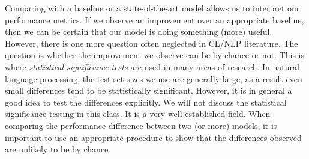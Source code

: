 Comparing with a baseline or a state-of-the-art model allows us
to interpret our performance metrics.
If we observe an improvement over an appropriate baseline,
then we can be certain that our model is doing something (more) useful.
However,
there is one more question often neglected in CL/NLP literature.
The question is whether the improvement we observe can be by chance or not.
This is where \emph{statistical significance tests} are used
in many areas of research.
In natural language processing,
the test set sizes we use are generally large,
as a result even small differences tend to be statistically significant.
However, it is in general a good idea to test the differences explicitly.
We will not discuss the statistical significance testing in this class.
It is a very well established field.
When comparing the performance difference
between two (or more) models,
it is important to use an appropriate procedure
to show that the differences observed are unlikely to be by chance.

